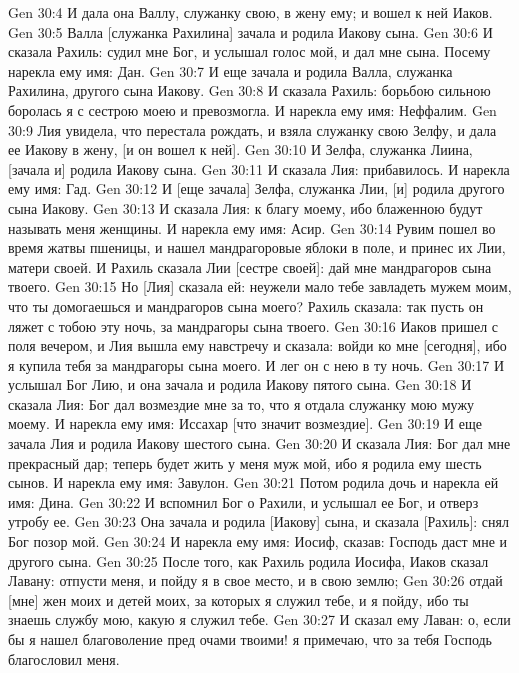 \vs Gen 30:4 И дала она Валлу, служанку свою, в жену ему; и вошел к ней Иаков.
\vs Gen 30:5 Валла [служанка Рахилина] зачала и родила Иакову сына.
\vs Gen 30:6 И сказала Рахиль: судил мне Бог, и услышал голос мой, и дал мне сына. Посему нарекла ему имя: Дан.
\vs Gen 30:7 И еще зачала и родила Валла, служанка Рахилина, другого сына Иакову.
\vs Gen 30:8 И сказала Рахиль: борьбою сильною боролась я с сестрою моею и превозмогла. И нарекла ему имя: Неффалим.
\vs Gen 30:9 Лия увидела, что перестала рождать, и взяла служанку свою Зелфу, и дала ее Иакову в жену, [и он вошел к ней].
\vs Gen 30:10 И Зелфа, служанка Лиина, [зачала и] родила Иакову сына.
\vs Gen 30:11 И сказала Лия: прибавилось. И нарекла ему имя: Гад.
\vs Gen 30:12 И [еще зачала] Зелфа, служанка Лии, [и] родила другого сына Иакову.
\vs Gen 30:13 И сказала Лия: к благу моему, ибо блаженною будут называть меня женщины. И нарекла ему имя: Асир.
\vs Gen 30:14 Рувим пошел во время жатвы пшеницы, и нашел мандрагоровые яблоки в поле, и принес их Лии, матери своей. И Рахиль сказала Лии [сестре своей]: дай мне мандрагоров сына твоего.
\vs Gen 30:15 Но [Лия] сказала ей: неужели мало тебе завладеть мужем моим, что ты домогаешься и мандрагоров сына моего? Рахиль сказала: так пусть он ляжет с тобою эту ночь, за мандрагоры сына твоего.
\vs Gen 30:16 Иаков пришел с поля вечером, и Лия вышла ему навстречу и сказала: войди ко мне [сегодня], ибо я купила тебя за мандрагоры сына моего. И лег он с нею в ту ночь.
\vs Gen 30:17 И услышал Бог Лию, и она зачала и родила Иакову пятого сына.
\vs Gen 30:18 И сказала Лия: Бог дал возмездие мне за то, что я отдала служанку мою мужу моему. И нарекла ему имя: Иссахар [что значит возмездие].
\vs Gen 30:19 И еще зачала Лия и родила Иакову шестого сына.
\vs Gen 30:20 И сказала Лия: Бог дал мне прекрасный дар; теперь будет жить у меня муж мой, ибо я родила ему шесть сынов. И нарекла ему имя: Завулон.
\vs Gen 30:21 Потом родила дочь и нарекла ей имя: Дина.
\vs Gen 30:22 И вспомнил Бог о Рахили, и услышал ее Бог, и отверз утробу ее.
\vs Gen 30:23 Она зачала и родила [Иакову] сына, и сказала [Рахиль]: снял Бог позор мой.
\vs Gen 30:24 И нарекла ему имя: Иосиф, сказав: Господь даст мне и другого сына.
\rsbpar\vs Gen 30:25 После того, как Рахиль родила Иосифа, Иаков сказал Лавану: отпусти меня, и пойду я в свое место, и в свою землю;
\vs Gen 30:26 отдай [мне] жен моих и детей моих, за которых я служил тебе, и я пойду, ибо ты знаешь службу мою, какую я служил тебе.
\vs Gen 30:27 И сказал ему Лаван: о, если бы я нашел благоволение пред очами твоими! я примечаю, что за тебя Господь благословил меня.
